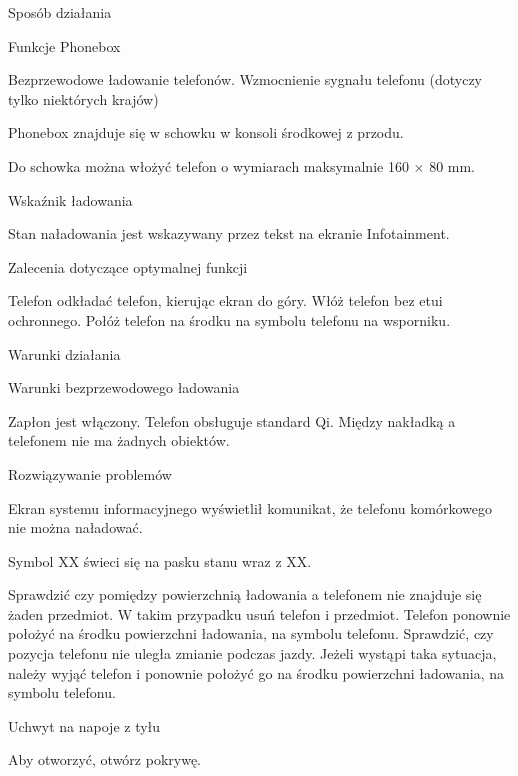 Sposób działania

Funkcje Phonebox
\begin{itemizeTriangle}
	\itemTriangle Bezprzewodowe ładowanie telefonów.
	\itemTriangle Wzmocnienie sygnału telefonu (dotyczy tylko niektórych krajów)
\end{itemizeTriangle}

Phonebox znajduje się w schowku w konsoli środkowej z przodu.

Do schowka można włożyć telefon o wymiarach maksymalnie 160 × 80 mm.

Wskaźnik ładowania

Stan naładowania jest wskazywany przez tekst na ekranie Infotainment.

Zalecenia dotyczące optymalnej funkcji
\begin{itemizeTriangle}
	\itemTriangle Telefon odkładać telefon, kierując ekran do góry.
	\itemTriangle Włóż telefon bez etui ochronnego.
	\itemTriangle Połóż telefon na środku na symbolu telefonu na wsporniku.
\end{itemizeTriangle}

Warunki działania

Warunki bezprzewodowego ładowania
\begin{itemizeTick}
	\itemTick Zapłon jest włączony.
	\itemTick Telefon obsługuje standard Qi.
	\itemTick Między nakładką a telefonem nie ma żadnych obiektów.
\end{itemizeTick}

Rozwiązywanie problemów

Ekran systemu informacyjnego wyświetlił komunikat, że telefonu komórkowego nie można naładować.

Symbol XX świeci się na pasku stanu wraz z XX.
\begin{itemizeTriangle}
	\itemTriangle Sprawdzić czy pomiędzy powierzchnią ładowania a telefonem nie znajduje się żaden przedmiot. W takim przypadku usuń telefon i przedmiot. Telefon ponownie położyć na środku powierzchni ładowania, na symbolu telefonu.
	\itemTriangle Sprawdzić, czy pozycja telefonu nie uległa zmianie podczas jazdy. Jeżeli wystąpi taka sytuacja, należy wyjąć telefon i ponownie położyć go na środku powierzchni ładowania, na symbolu telefonu.
\end{itemizeTriangle}

Uchwyt na napoje z tyłu


\begin{itemizeArrow}
	\itemArrow Aby otworzyć, otwórz pokrywę.
\end{itemizeArrow}

